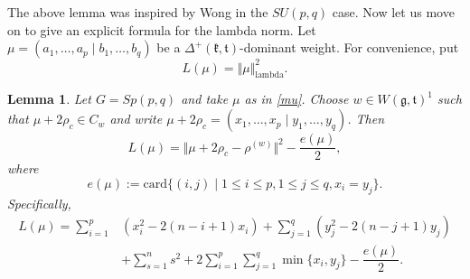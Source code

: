 \documentclass[11pt]{amsart}
\theoremstyle{plain}
\newtheorem{lemma}[thm]{Lemma}
\theoremstyle{definition}
\newcommand{\frg}{\mathfrak{g}}
\newcommand{\frk}{\mathfrak{k}}
\newcommand{\frt}{\mathfrak{t}}
\begin{document}
 The above lemma was inspired by Wong \cite{W24} in the $SU(p, q)$ case. Now let us move on to give an explicit formula for the lambda norm.
 Let $\mu=(a_1,\dots,a_p\mid b_1,\dots,b_q)$ be a $\Delta^+(\frk,\frt)$-dominant weight. For convenience, put
 \begin{equation}\label{L-mu}
 L(\mu)=\Vert\mu\Vert_{\mathrm{lambda}}^2.
 \end{equation}
 \begin{lemma}\label{lambda-2}
 	Let $G=Sp(p,q)$ and take $\mu$ as in \eqref{mu}. Choose $w\in W(\frg,\frt)^1$ such that $\mu+2\rho_c \in C_{w}$ and write $\mu+2\rho_c=(x_1,\dots,x_p\mid y_1,\dots,y_q)$.
 	Then
 	\begin{equation}\label{L-0}
 		L(\mu)=\Vert \mu+2\rho_c-\rho^{(w)}\Vert^2-\dfrac{e(\mu)}{2},
 	\end{equation}
 	where
 	\[e(\mu):=\mathrm{card}\{(i,j)\mid 1\le i\le p,1\le j\le q,x_i=y_j\}.\]
Specifically,
\begin{equation}\label{L-1}
 	\begin{split}
 		L(\mu)=\sum_{i=1}^p&(x_i^2-2(n-i+1)x_i)+\sum_{j=1}^q(y_j^2-2(n-j+1)y_j)\\
 		&+\sum_{s=1}^ns^2+2\sum_{i=1}^p\sum_{j=1}^q\min\{x_i,y_j\}-\dfrac{e(\mu)}{2}.
 	\end{split}
 \end{equation}
 \end{lemma}
\end{document}
